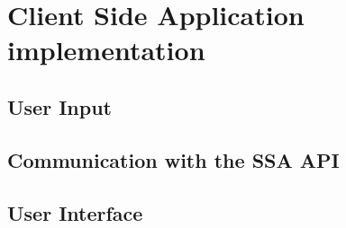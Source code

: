 \section{Client Side Application implementation}
\label{sec:csa_implementation}



\subsection{User Input}
\label{sec:user_input}


\subsection{Communication with the SSA API}
\label{sec:api_communication}


\subsection{User Interface}
\label{sec:user_interface_ready}
